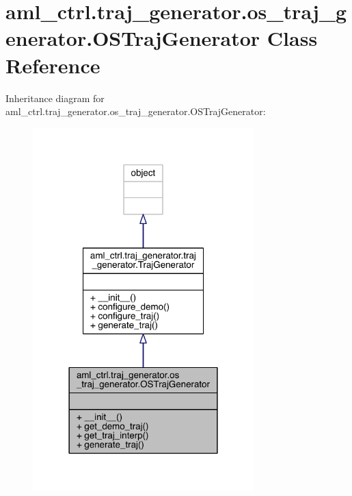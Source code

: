 \hypertarget{classaml__ctrl_1_1traj__generator_1_1os__traj__generator_1_1_o_s_traj_generator}{}\section{aml\+\_\+ctrl.\+traj\+\_\+generator.\+os\+\_\+traj\+\_\+generator.\+O\+S\+Traj\+Generator Class Reference}
\label{classaml__ctrl_1_1traj__generator_1_1os__traj__generator_1_1_o_s_traj_generator}


Inheritance diagram for aml\+\_\+ctrl.\+traj\+\_\+generator.\+os\+\_\+traj\+\_\+generator.\+O\+S\+Traj\+Generator\+:\nopagebreak
\begin{figure}[H]
\begin{center}
\leavevmode
\includegraphics[width=242pt]{classaml__ctrl_1_1traj__generator_1_1os__traj__generator_1_1_o_s_traj_generator__inherit__graph}
\end{center}
\end{figure}



